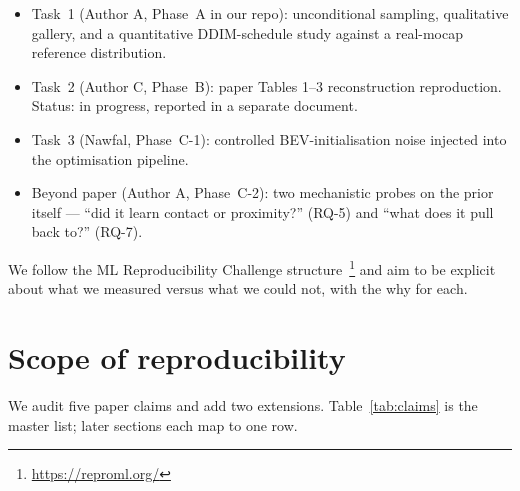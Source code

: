 \documentclass[10pt]{article}
\begin{document}
\begin{itemize}
    \item Task~1 (Author A, Phase~A in our repo): unconditional sampling, qualitative gallery, and a quantitative DDIM-schedule study against a real-mocap reference distribution.
    \item Task~2 (Author C, Phase~B): paper Tables 1--3 reconstruction reproduction. Status: in progress, reported in a separate document.
    \item Task~3 (Nawfal, Phase~C-1): controlled BEV-initialisation noise injected into the optimisation pipeline.
    \item Beyond paper (Author A, Phase~C-2): two mechanistic probes on the prior itself --- ``did it learn contact or proximity?'' (RQ-5) and ``what does it pull back to?'' (RQ-7).
\end{itemize}

We follow the ML Reproducibility Challenge structure~\citep{muller2024generative}\footnote{\url{https://reproml.org/}} and aim to be explicit about what we measured versus what we could not, with the why for each.

\section{Scope of reproducibility}
\label{sec:claims}

We audit five paper claims and add two extensions. Table~\ref{tab:claims} is the master list; later sections each map to one row.
\end{document}

